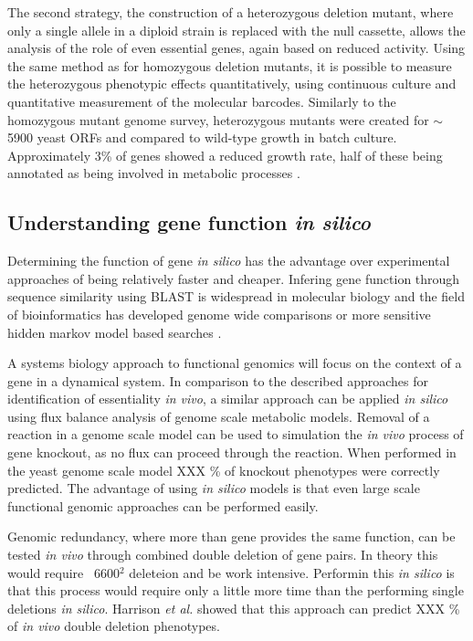 The second strategy, the construction of a heterozygous deletion mutant, where only a single allele in a diploid strain is replaced with the null cassette, allows the analysis of the role of even essential genes, again based on reduced activity. Using the same method as for homozygous deletion mutants, it is possible to measure the heterozygous phenotypic effects quantitatively, using continuous culture and quantitative measurement of the molecular barcodes. Similarly to the homozygous mutant genome survey, heterozygous mutants were created for $\sim$5900 yeast ORFs and compared to wild-type growth in batch culture. Approximately 3\% of genes showed a reduced growth rate, half of these being annotated as being involved in metabolic processes \cite{deutschbauer2005}.

\subsection{Understanding gene function \emph{in silico}}

Determining the function of gene \emph{in silico} has the advantage over experimental approaches of being relatively faster and cheaper. Infering gene function through sequence similarity using BLAST \cite{blast} is widespread in molecular biology and the field of bioinformatics has developed genome wide comparisons \cite{blat} or more sensitive hidden markov model based searches \cite{hmmer}.

A systems biology approach to functional genomics will focus on the context of a gene in a dynamical system. In comparison to the described approaches for identification of essentiality \emph{in vivo}, a similar approach can be applied \emph{in silico} using flux balance analysis of genome scale metabolic models. Removal of a reaction in a genome scale model can be used to simulation the \emph{in vivo} process of gene knockout, as no flux can proceed through the reaction. When performed in the yeast genome scale model XXX \% of knockout phenotypes were correctly predicted. The advantage of using \emph{in silico} models is that even large scale functional genomic approaches can be performed easily. 

Genomic redundancy, where more than gene provides the same function, can be tested \emph{in vivo} through combined double deletion of gene pairs. In theory this would require ~6600$^2$ deleteion and be work intensive. Performin this \emph{in silico} is that this process would require only a little more time than the performing single deletions \emph{in silico}. Harrison \emph{et al.} \cite{harrison2007} showed that this approach can predict XXX \% of \emph{in vivo} double deletion phenotypes.

